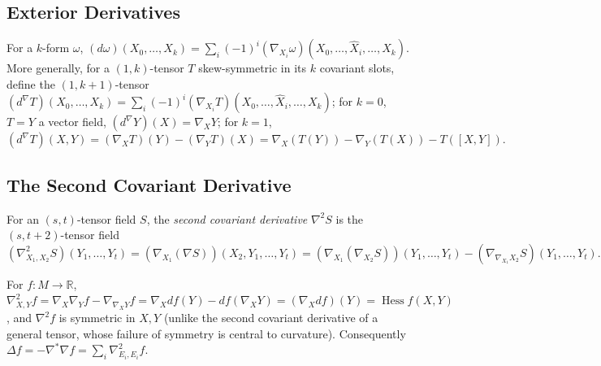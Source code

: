 \subsection{Exterior Derivatives}

\begin{definition}
  \label{def:pet-ch2-exterior-derivative-covariant}
  \leanok
  For a $k$-form $\omega$, $(d\omega)(X_0,\dots,X_k)=\sum_i(-1)^i(\nabla_{X_i}\omega)(X_0,\dots,\hat X_i,\dots,X_k)$.
  More generally, for a $(1,k)$-tensor $T$ skew-symmetric in its $k$
  covariant slots, define the $(1,k+1)$-tensor
  $(d^\nabla T)(X_0,\dots,X_k)=\sum_i(-1)^i(\nabla_{X_i}T)(X_0,\dots,\hat X_i,\dots,X_k)$;
  for $k=0$, $T=Y$ a vector field, $(d^\nabla Y)(X)=\nabla_XY$; for $k=1$,
  \[
    (d^\nabla T)(X,Y)=(\nabla_XT)(Y)-(\nabla_YT)(X)
    =\nabla_X(T(Y))-\nabla_Y(T(X))-T([X,Y]).
  \]
\end{definition}

\subsection{The Second Covariant Derivative}

\begin{definition}
  \label{def:pet-ch2-second-covariant-derivative}
  \leanok
  For an $(s,t)$-tensor field $S$, the \emph{second covariant derivative}
  $\nabla^2S$ is the $(s,t+2)$-tensor field
  \[
    (\nabla^2_{X_1,X_2}S)(Y_1,\dots,Y_t)
    = (\nabla_{X_1}(\nabla S))(X_2,Y_1,\dots,Y_t)
    = (\nabla_{X_1}(\nabla_{X_2}S))(Y_1,\dots,Y_t)-(\nabla_{\nabla_{X_1}X_2}S)(Y_1,\dots,Y_t).
  \]
\end{definition}

\begin{remark}
  \label{rem:pet-ch2-hessian-second-covariant-derivative}
  \leanok
  For $f:M\to\mathbb{R}$, $\nabla^2_{X,Y}f=\nabla_X\nabla_Yf-\nabla_{\nabla_XY}f
  =\nabla_Xdf(Y)-df(\nabla_XY)=(\nabla_Xdf)(Y)=\operatorname{Hess}f(X,Y)$, and
  $\nabla^2f$ is symmetric in $X,Y$ (unlike the second covariant derivative of
  a general tensor, whose failure of symmetry is central to curvature).
  Consequently $\Delta f=-\nabla^*\nabla f=\sum_i\nabla^2_{E_i,E_i}f$.
\end{remark}

